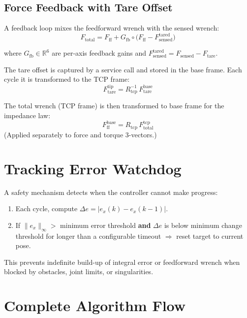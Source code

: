 \documentclass[11pt,a4paper]{article}
\newcommand{\R}{\mathbb{R}}
\newcommand{\odot}{\circ}  %
\begin{document}
\subsection{Force Feedback with Tare Offset}
\label{sec:force_fb}

A feedback loop mixes the feedforward wrench with the sensed wrench:
\begin{equation}
  F_{\text{total}}
  = F_{\text{ff}}
    + G_{\text{fb}} \odot \bigl(F_{\text{ff}} - F_{\text{sensed}}^{\text{tared}}\bigr)
  \label{eq:force_fb}
\end{equation}

where $G_{\text{fb}} \in \R^6$ are per-axis feedback gains and
$F_{\text{sensed}}^{\text{tared}} = F_{\text{sensed}} - F_{\text{tare}}$.

The tare offset is captured by a service call and stored in the base frame.
Each cycle it is transformed to the TCP frame:
\[
  F_{\text{tare}}^{\text{tip}} = R_{\text{tcp}}^{-1}\,F_{\text{tare}}^{\text{base}}
\]

The total wrench (TCP frame) is then transformed to base frame for the
impedance law:
\[
  F_{\text{ff}}^{\text{base}} = R_{\text{tcp}}\,F_{\text{total}}^{\text{tcp}}
\]
(Applied separately to force and torque 3-vectors.)


\section{Tracking Error Watchdog}
\label{sec:watchdog}

A safety mechanism detects when the controller cannot make progress:

\begin{enumerate}[nosep]
  \item Each cycle, compute
    $\Delta e = |e_x(k) - e_x(k\!-\!1)|$.
  \item If $\|e_x\|_\infty >$ minimum error threshold \textbf{and}
    $\Delta e$ is below minimum change threshold for longer than a configurable
    timeout $\Longrightarrow$ reset target to current pose.
\end{enumerate}

This prevents indefinite build-up of integral error or feedforward wrench when
blocked by obstacles, joint limits, or singularities.


\section{Complete Algorithm Flow}
\label{sec:flow}
\end{document}

